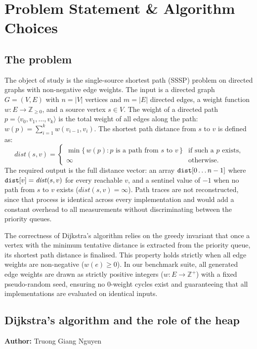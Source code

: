 \section{Problem Statement \& Algorithm Choices}

\subsection{The problem}

The object of study is the single-source shortest path (SSSP) problem on
directed graphs with non-negative edge weights. The input is a directed graph
$G = (V, E)$ with $n = |V|$ vertices and $m = |E|$ directed edges, a weight function
$w : E \to \mathbb{Z}_{\ge 0}$, and a source vertex $s \in V$. The weight of
a directed path $p = \langle v_0, v_1, \ldots, v_k \rangle$ is the total weight of all edges along the path:
$w(p) = \sum_{i=1}^{k} w(v_{i-1}, v_i)$. The shortest path distance from
$s$ to $v$ is defined as:
\[
  \mathit{dist}(s, v) =
  \begin{cases}
    \min \{\, w(p) : p \text{ is a path from } s \text{ to } v \,\}
      & \text{if such a } p \text{ exists,} \\
    \infty & \text{otherwise.}
  \end{cases}
\]
The required output is the full distance vector: an array
$\code{dist}[0 \ldots n-1]$ where $\code{dist}[v] = \mathit{dist}(s, v)$ for every
reachable $v$, and a sentinel value of $-1$ when no path from $s$ to $v$ exists ($\mathit{dist}(s, v) = \infty$).
Path traces are not reconstructed, since that process is identical across every implementation and would add a constant overhead to all measurements without discriminating between the priority queues.

The correctness of Dijkstra's algorithm relies on the greedy invariant that once a vertex with the minimum tentative distance is extracted from the priority queue, its shortest path distance is finalised. This property holds strictly when all edge weights are non-negative ($w(e) \ge 0$). In our benchmark suite, all generated edge weights are drawn as strictly positive integers ($w : E \to \mathbb{Z}^{+}$) with a fixed pseudo-random seed, ensuring no 0-weight cycles exist and guaranteeing that all implementations are evaluated on identical inputs.

\subsection{Dijkstra's algorithm and the role of the heap}
\vspace{-0.2cm}
{\small \textbf{Author:} Truong Giang Nguyen}

